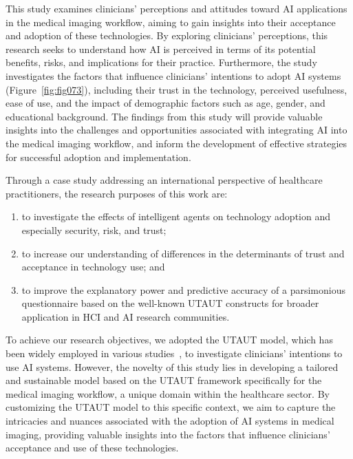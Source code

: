 This study examines clinicians' perceptions and attitudes toward \ac{AI} applications in the medical imaging workflow, aiming to gain insights into their acceptance and adoption of these technologies.
By exploring clinicians' perceptions, this research seeks to understand how \ac{AI} is perceived in terms of its potential benefits, risks, and implications for their practice.
Furthermore, the study investigates the factors that influence clinicians' intentions to adopt \ac{AI} systems (Figure~\ref{fig:fig073}), including their trust in the technology, perceived usefulness, ease of use, and the impact of demographic factors such as age, gender, and educational background.
The findings from this study will provide valuable insights into the challenges and opportunities associated with integrating \ac{AI} into the medical imaging workflow, and inform the development of effective strategies for successful adoption and implementation.

\vspace{2.00mm}

\noindent
Through a case study addressing an international perspective of healthcare practitioners, the research purposes of this work are:

\vspace{0.05mm}

\begin{enumerate}
\item to investigate the effects of intelligent agents on technology adoption and especially security, risk, and trust;
\item to increase our understanding of differences in the determinants of trust and acceptance in technology use; and
\item to improve the explanatory power and predictive accuracy of a parsimonious questionnaire based on the well-known \ac{UTAUT} constructs for broader application in \ac{HCI} and \ac{AI} research communities.
\end{enumerate}

\vspace{0.05mm}

To achieve our research objectives, we adopted the \ac{UTAUT} model, which has been widely employed in various studies~\cite{BOOTSMAN201999, DEANGELI2020102412, HART201993, HOEHLE201635, LOOIJE2010386, MCGLYNN201733, MOORE2022102784}, to investigate clinicians' intentions to use \ac{AI} systems.
However, the novelty of this study lies in developing a tailored and sustainable model based on the \ac{UTAUT} framework specifically for the medical imaging workflow, a unique domain within the healthcare sector.
By customizing the \ac{UTAUT} model to this specific context, we aim to capture the intricacies and nuances associated with the adoption of \ac{AI} systems in medical imaging, providing valuable insights into the factors that influence clinicians' acceptance and use of these technologies.

